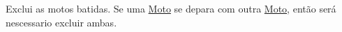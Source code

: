 Exclui as motos batidas. Se uma \mbox{\hyperlink{class_moto}{Moto}} se depara com outra \mbox{\hyperlink{class_moto}{Moto}}, então será nescessario excluir ambas. ~\newline
~\newline
~\newline
~\newline
~\newline
~\newline
~\newline
~\newline
~\newline
~\newline
~\newline
~\newline
~\newline
~\newline
~\newline
~\newline
~\newline
~\newline
~\newline
~\newline
~\newline
~\newline
~\newline
~\newline
~\newline
~\newline
~\newline
~\newline
~\newline
~\newline
~\newline
~\newline
~\newline
~\newline
~\newline
~\newline
~\newline
~\newline
~\newline
~\newline
~\newline
~\newline
~\newline
~\newline
~\newline
~\newline
~\newline
~\newline
~\newline
